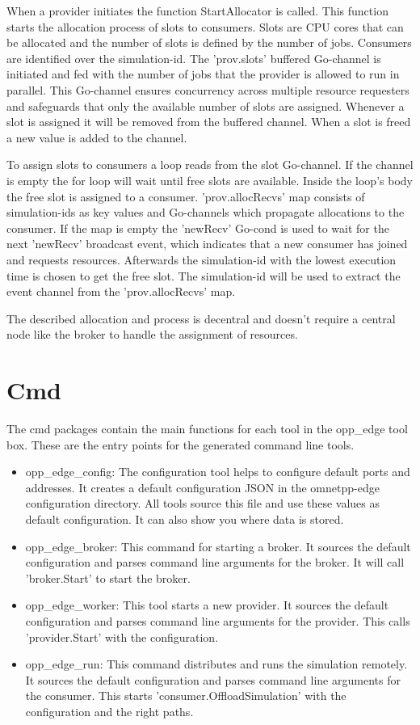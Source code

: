 When a provider initiates the function StartAllocator is called. This function starts the allocation process of slots to consumers. Slots are CPU cores that can be allocated and the number of slots is defined by the number of jobs. Consumers are identified over the simulation-id. The 'prov.slots' buffered Go-channel is initiated and fed with the number of jobs that the provider is allowed to run in parallel. This Go-channel ensures concurrency across multiple resource requesters and safeguards that only the available number of slots are assigned. Whenever a slot is assigned it will be removed from the buffered channel. When a slot is freed a new value is added to the channel.

To assign slots to consumers a loop reads from the slot Go-channel. If the channel is empty the for loop will wait until free slots are available. Inside the loop's body the free slot is assigned to a consumer. 'prov.allocRecvs' map consists of simulation-ids as key values and Go-channels which propagate allocations to the consumer. If the map is empty the 'newRecv' Go-cond is used to wait for the next 'newRecv' broadcast event, which indicates that a new consumer has joined and requests resources. Afterwards the simulation-id with the lowest execution time is chosen to get the free slot. The simulation-id will be used to extract the event channel from the 'prov.allocRecvs' map.

The described allocation and process is decentral and doesn't require a central node like the broker to handle the assignment of resources.

\section{Cmd}
The cmd packages contain the main functions for each tool in the opp\_edge tool box. These are the entry points for the generated command line tools.

\begin{itemize}
    \item opp\_edge\_config: The configuration tool helps to configure default ports and addresses. It creates a default configuration JSON in the omnetpp-edge configuration directory. All tools source this file and use these values as default configuration. It can also show you where data is stored.
    \item opp\_edge\_broker: This command for starting a broker. It sources the default configuration and parses command line arguments for the broker. It will call 'broker.Start' to start the broker.
    \item opp\_edge\_worker: This tool starts a new provider. It sources the default configuration and parses command line arguments for the provider. This calls 'provider.Start' with the configuration.
    \item opp\_edge\_run: This command distributes and runs the simulation remotely. It sources the default configuration and parses command line arguments for the consumer. This starts 'consumer.OffloadSimulation' with the configuration and the right paths.
\end{itemize}


